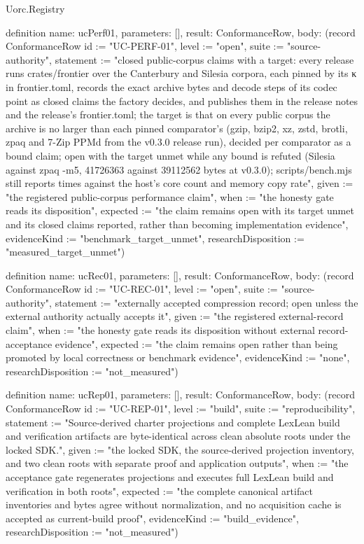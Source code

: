 \begin{lexlean}{Uorc.Registry}
\begin{semanticmodule}
definition{
  name: ucPerf01,
  parameters: [],
  result: ConformanceRow,
  body: (record ConformanceRow {id := "UC-PERF-01", level := "open", suite := "source-authority", statement := "closed public-corpus claims with a target: every release runs crates/frontier over the Canterbury and Silesia corpora, each pinned by its κ in frontier.toml, records the exact archive bytes and decode steps of its codec point as closed claims the factory decides, and publishes them in the release notes and the release's frontier.toml; the target is that on every public corpus the archive is no larger than each pinned comparator's (gzip, bzip2, xz, zstd, brotli, zpaq and 7-Zip PPMd from the v0.3.0 release run), decided per comparator as a bound claim; open with the target unmet while any bound is refuted (Silesia against zpaq -m5, 41726363 against 39112562 bytes at v0.3.0); scripts/bench.mjs still reports times against the host's core count and memory copy rate", given := "the registered public-corpus performance claim", when := "the honesty gate reads its disposition", expected := "the claim remains open with its target unmet and its closed claims reported, rather than becoming implementation evidence", evidenceKind := "benchmark_target_unmet", researchDisposition := "measured_target_unmet"})
}

definition{
  name: ucRec01,
  parameters: [],
  result: ConformanceRow,
  body: (record ConformanceRow {id := "UC-REC-01", level := "open", suite := "source-authority", statement := "externally accepted compression record; open unless the external authority actually accepts it", given := "the registered external-record claim", when := "the honesty gate reads its disposition without external record-acceptance evidence", expected := "the claim remains open rather than being promoted by local correctness or benchmark evidence", evidenceKind := "none", researchDisposition := "not_measured"})
}

definition{
  name: ucRep01,
  parameters: [],
  result: ConformanceRow,
  body: (record ConformanceRow {id := "UC-REP-01", level := "build", suite := "reproducibility", statement := "Source-derived charter projections and complete LexLean build and verification artifacts are byte-identical across clean absolute roots under the locked SDK.", given := "the locked SDK, the source-derived projection inventory, and two clean roots with separate proof and application outputs", when := "the acceptance gate regenerates projections and executes full LexLean build and verification in both roots", expected := "the complete canonical artifact inventories and bytes agree without normalization, and no acquisition cache is accepted as current-build proof", evidenceKind := "build_evidence", researchDisposition := "not_measured"})
}


\end{semanticmodule}
\end{lexlean}
